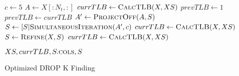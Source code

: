 \begin{algorithm}
\begin{algorithmic}
	\State $c \gets 5$
	\State $A \gets X[:N_t, :]$
	\State $currTLB \gets \textsc{CalcTLB}(X, XS)$
	\State $prevTLB \gets 1$
		\State $prevTLB \gets currTLB$
		\State $A' \gets \textsc{ProjectOff}(A,S)$
		\State $S \gets [S | \textsc{SimultaneousIteration}(A', c)$
		\State $currTLB \gets \textsc{CalcTLB}(X, XS)$ 
	\EndWhile
	\State $S \gets \textsc{Refine}(X, S)$
	\State $currTLB \gets \textsc{CalcTLB}(X, XS)$
	
	\Return $XS, currTLB, S.\textsc{cols}, S$
\EndFunction
\end{algorithmic}
\caption{Optimized DROP K Finding}
\label{alg:Optimized}
\end{algorithm}






